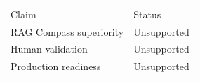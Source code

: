 \begin{tabular}{ll}Claim & Status \\ RAG Compass superiority & Unsupported \\ Human validation & Unsupported \\ Production readiness & Unsupported \\\end{tabular}
